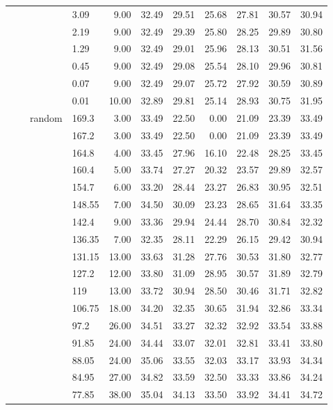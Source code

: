 \begin{longtable}{llllrrrrrrr}
   &  &  & 3.09 & 9.00 & 32.49 & 29.51 & 25.68 & 27.81 & 30.57 & 30.94 \\ 
   &  &  & 2.19 & 9.00 & 32.49 & 29.39 & 25.80 & 28.25 & 29.89 & 30.80 \\ 
   &  &  & 1.29 & 9.00 & 32.49 & 29.01 & 25.96 & 28.13 & 30.51 & 31.56 \\ 
   &  &  & 0.45 & 9.00 & 32.49 & 29.08 & 25.54 & 28.10 & 29.96 & 30.81 \\ 
   &  &  & 0.07 & 9.00 & 32.49 & 29.07 & 25.72 & 27.92 & 30.59 & 30.89 \\ 
   &  &  & 0.01 & 10.00 & 32.89 & 29.81 & 25.14 & 28.93 & 30.75 & 31.95 \\ 
   &  & random & 169.3 & 3.00 & 33.49 & 22.50 & 0.00 & 21.09 & 23.39 & 33.49 \\ 
   &  &  & 167.2 & 3.00 & 33.49 & 22.50 & 0.00 & 21.09 & 23.39 & 33.49 \\ 
   &  &  & 164.8 & 4.00 & 33.45 & 27.96 & 16.10 & 22.48 & 28.25 & 33.45 \\ 
   &  &  & 160.4 & 5.00 & 33.74 & 27.27 & 20.32 & 23.57 & 29.89 & 32.57 \\ 
   &  &  & 154.7 & 6.00 & 33.20 & 28.44 & 23.27 & 26.83 & 30.95 & 32.51 \\ 
   &  &  & 148.55 & 7.00 & 34.50 & 30.09 & 23.23 & 28.65 & 31.64 & 33.35 \\ 
   &  &  & 142.4 & 9.00 & 33.36 & 29.94 & 24.44 & 28.70 & 30.84 & 32.32 \\ 
   &  &  & 136.35 & 7.00 & 32.35 & 28.11 & 22.29 & 26.15 & 29.42 & 30.94 \\ 
   &  &  & 131.15 & 13.00 & 33.63 & 31.28 & 27.76 & 30.53 & 31.80 & 32.77 \\ 
   &  &  & 127.2 & 12.00 & 33.80 & 31.09 & 28.95 & 30.57 & 31.89 & 32.79 \\ 
   &  &  & 119 & 13.00 & 33.72 & 30.94 & 28.50 & 30.46 & 31.71 & 32.82 \\ 
   &  &  & 106.75 & 18.00 & 34.20 & 32.35 & 30.65 & 31.94 & 32.86 & 33.34 \\ 
   &  &  & 97.2 & 26.00 & 34.51 & 33.27 & 32.32 & 32.92 & 33.54 & 33.88 \\ 
   &  &  & 91.85 & 24.00 & 34.44 & 33.07 & 32.01 & 32.81 & 33.41 & 33.80 \\ 
   &  &  & 88.05 & 24.00 & 35.06 & 33.55 & 32.03 & 33.17 & 33.93 & 34.34 \\ 
   &  &  & 84.95 & 27.00 & 34.82 & 33.59 & 32.50 & 33.33 & 33.86 & 34.24 \\ 
   &  &  & 77.85 & 38.00 & 35.04 & 34.13 & 33.50 & 33.92 & 34.41 & 34.72 \\ 

\end{longtable}

